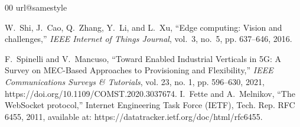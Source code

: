 \documentclass[conference]{IEEEtran}
\begin{document}
\def\bibfont{\scriptsize}\balance
\begin{thebibliography}{00}\setlength{\itemsep}{0pt}\setlength{\parskip}{0pt}
\providecommand{\url}[1]{#1}
\csname url@samestyle\endcsname
\providecommand{\newblock}{\relax}
\providecommand{\bibinfo}[2]{#2}
\providecommand{\BIBentrySTDinterwordspacing}{\spaceskip=0pt\relax}
\providecommand{\BIBentryALTinterwordstretchfactor}{4}
\providecommand{\BIBentryALTinterwordspacing}{\spaceskip=\fontdimen2\font plus
\BIBentryALTinterwordstretchfactor\fontdimen3\font minus
  \fontdimen4\font\relax}
\providecommand{\BIBforeignlanguage}[2]{{%
\expandafter\ifx\csname l@#1\endcsname\relax
\typeout{** WARNING: IEEEtran.bst: No hyphenation pattern has been}%
\typeout{** loaded for the language `#1'. Using the pattern for}%
\typeout{** the default language instead.}%
\else
\language=\csname l@#1\endcsname
\fi
#2}}
\providecommand{\BIBdecl}{\relax}
\BIBdecl

W.~Shi, J.~Cao, Q.~Zhang, Y.~Li, and L.~Xu, ``Edge computing: Vision and challenges,'' \emph{IEEE Internet of Things Journal}, vol.~3, no.~5, pp. 637--646, 2016.

F.~Spinelli and V.~Mancuso, ``Toward Enabled Industrial Verticals in 5G: A Survey on MEC-Based Approaches to Provisioning and Flexibility,'' \emph{IEEE Communications Surveys \& Tutorials}, vol. 23, no. 1, pp. 596--630, 2021, \url{https://doi.org/10.1109/COMST.2020.3037674}.
I.~Fette and A.~Melnikov, ``The {WebSocket} protocol,'' Internet Engineering
  Task Force (IETF), Tech. Rep. RFC 6455, 2011, available at:
  \url{https://datatracker.ietf.org/doc/html/rfc6455}.


\end{thebibliography}
\end{document}
